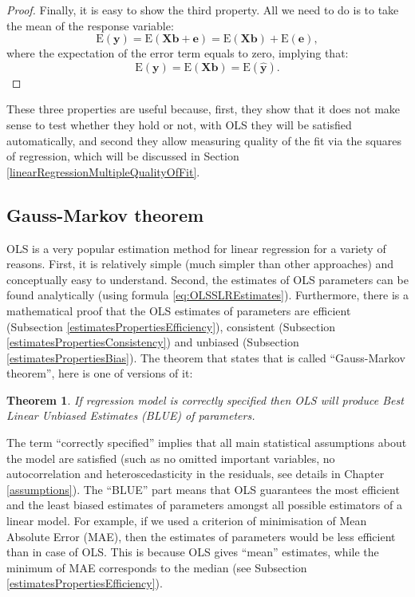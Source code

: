 \documentclass[
]{book}
\newtheorem{theorem}{Theorem}[chapter]
\theoremstyle{definition}
\theoremstyle{definition}
\theoremstyle{definition}
\theoremstyle{definition}
\theoremstyle{remark}
\begin{document}
\begin{proof}
Finally, it is easy to show the third property. All we need to do is to take the mean of the response variable:
\begin{equation*}
    \mathrm{E}(\mathbf{y}) = \mathrm{E}(\mathbf{X} \boldsymbol{b} + \boldsymbol{e}) = \mathrm{E}(\mathbf{X} \boldsymbol{b}) + \mathrm{E}(\boldsymbol{e}) ,
\end{equation*}
where the expectation of the error term equals to zero, implying that:
\begin{equation*}
    \mathrm{E}(\mathbf{y}) = \mathrm{E}(\mathbf{X} \boldsymbol{b}) = \mathrm{E}(\hat{\mathbf{y}}) .
\end{equation*}
\end{proof}

These three properties are useful because, first, they show that it does not make sense to test whether they hold or not, with OLS they will be satisfied automatically, and second they allow measuring quality of the fit via the squares of regression, which will be discussed in Section \ref{linearRegressionMultipleQualityOfFit}.

\subsection{Gauss-Markov theorem}\label{GaussMarkov}

OLS is a very popular estimation method for linear regression for a variety of reasons. First, it is relatively simple (much simpler than other approaches) and conceptually easy to understand. Second, the estimates of OLS parameters can be found analytically (using formula \eqref{eq:OLSSLREstimates}). Furthermore, there is a mathematical proof that the OLS estimates of parameters are efficient (Subsection \ref{estimatesPropertiesEfficiency}), consistent (Subsection \ref{estimatesPropertiesConsistency}) and unbiased (Subsection \ref{estimatesPropertiesBias}). The theorem that states that is called ``Gauss-Markov theorem'', here is one of versions of it:

\begin{theorem}
If regression model is correctly specified then OLS will produce Best Linear Unbiased Estimates (BLUE) of parameters.
\end{theorem}

The term ``correctly specified'' implies that all main statistical assumptions about the model are satisfied (such as no omitted important variables, no autocorrelation and heteroscedasticity in the residuals, see details in Chapter \ref{assumptions}). The ``BLUE'' part means that OLS guarantees the most efficient and the least biased estimates of parameters amongst all possible estimators of a linear model. For example, if we used a criterion of minimisation of Mean Absolute Error (MAE), then the estimates of parameters would be less efficient than in case of OLS. This is because OLS gives ``mean'' estimates, while the minimum of MAE corresponds to the median (see Subsection \ref{estimatesPropertiesEfficiency}).
\end{document}
